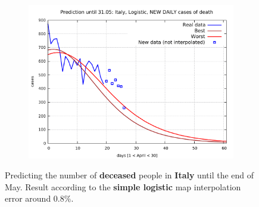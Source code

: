 \documentclass[8pt]{article}
\begin{document}
\begin{figure}[h!]
\begin{subfigure}[b]{0.48\linewidth}
  \includegraphics[width=\linewidth]{../it_l_d/peak/peak_prediction.pdf}
  \end{subfigure}
  \caption{Predicting the number of \textbf{deceased}
	people in \textbf{Italy} until the
	end of May. Result according to the \textbf{simple logistic} map
	interpolation error around $0.8\%$.}
\end{figure}
\end{document}
